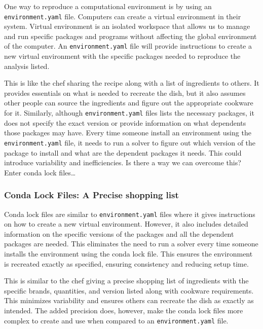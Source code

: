 \documentclass[
  letterpaper,
  DIV=11,
  numbers=noendperiod]{scrartcl}
\begin{document}
One way to reproduce a computational environment is by using an
\texttt{environment.yaml} file. Computers can create a virtual
environment in their system. Virtual environment is an isolated
workspace that allows us to manage and run specific packages and
programs without affecting the global environment of the computer. An
\texttt{environment.yaml} file will provide instructions to create a new
virtual environment with the specific packages needed to reproduce the
analysis listed.

This is like the chef sharing the recipe along with a list of
ingredients to others. It provides essentials on what is needed to
recreate the dish, but it also assumes other people can source the
ingredients and figure out the appropriate cookware for it. Similarly,
although \texttt{environment.yaml} files lists the necessary packages,
it does not specify the exact version or provide information on what
dependents those packages may have. Every time someone install an
environment using the \texttt{environment.yaml} file, it needs to run a
solver to figure out which version of the package to install and what
are the dependent packages it needs. This could introduce variability
and inefficiencies. Is there a way we can overcome this? Enter conda
lock files\ldots{}

\subsubsection{Conda Lock Files: A Precise shopping
list}\label{conda-lock-files-a-precise-shopping-list}

Conda lock files are similar to \texttt{environment.yaml} files where it
gives instructions on how to create a new virtual environment. However,
it also includes detailed information on the specific versions of the
packages and all the dependent packages are needed. This eliminates the
need to run a solver every time someone installs the environment using
the conda lock file. This ensures the environment is recreated exactly
as specified, ensuring consistency and reducing setup time.

This is similar to the chef giving a precise shopping list of
ingredients with the specific brands, quantities, and version listed
along with cookware requirements. This minimizes variability and ensures
others can recreate the dish as exactly as intended. The added precision
does, however, make the conda lock files more complex to create and use
when compared to an \texttt{environment.yaml} file.
\end{document}
